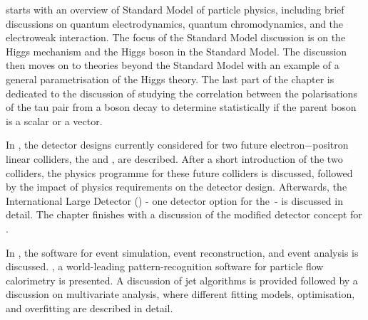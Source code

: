 
 starts with an overview of Standard Model of particle physics, including brief discussions on quantum electrodynamics, quantum chromodynamics, and the electroweak interaction. The focus of the Standard Model discussion is on the  Higgs mechanism and the Higgs boson in the Standard Model. The discussion then moves on to theories beyond the Standard Model with an example of   a general parametrisation of the Higgs theory. The last part of the chapter is dedicated to the discussion of studying the correlation between the polarisations of the  tau pair from a boson decay to determine statistically if the parent boson is a  scalar or a vector.



In , the detector designs currently considered for two future electron$-$positron linear colliders, the \ILC and \CLIC, are described. After a short introduction of the two colliders, the physics programme for these future colliders is discussed, followed by the impact of physics requirements on the detector design. Afterwards, the International Large Detector (\ILD) - one detector option for the \ILC\,- is discussed in detail. The chapter finishes with a discussion of the modified \ILD detector concept for \CLIC.

In , the software for event simulation, event reconstruction, and event analysis is  discussed.  \pandora, a world-leading pattern-recognition software for particle flow calorimetry is presented. A discussion of jet algorithms is provided followed by a discussion on  multivariate analysis, where different fitting models, optimisation, and overfitting are described in detail.




